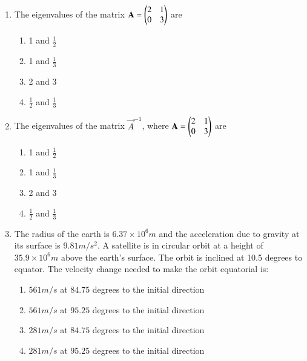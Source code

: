 \documentclass[journal]{IEEEtran}
\begin{document}
\begin{enumerate}
    \item The eigenvalues of the matrix $\mathbf{A} = \begin{pmatrix}2 & 1 \\ 0 & 3\end{pmatrix}$ are

    \begin{multicols}{4}
        \begin{enumerate}
            \item 1 and $\frac{1}{2}$
            \item 1 and $\frac{1}{3}$
            \item 2 and 3
            \item $\frac{1}{2}$ and $\frac{1}{3}$
        \end{enumerate}
    \end{multicols}

    \item The eigenvalues of the matrix $\vec{A}^{-1}$, where $\mathbf{A} = \begin{pmatrix}2 & 1 \\ 0 & 3\end{pmatrix}$ are

    \begin{multicols}{4}
        \begin{enumerate}
            \item 1 and $\frac{1}{2}$
            \item 1 and $\frac{1}{3}$
            \item 2 and 3
            \item $\frac{1}{2}$ and $\frac{1}{3}$
        \end{enumerate}
    \end{multicols}

    \item The radius of the earth is $6.37 \times 10^6 m$ and the acceleration due to gravity
    at its surface is $9.81 m/s^2$. A satellite is in circular orbit at a height of
    $35.9 \times 10^6 m$ above the earth's surface. The orbit is inclined at 10.5 degrees to
    equator. The velocity change needed to make the orbit equatorial is:

    \begin{enumerate}
        \item $561 m/s$ at $84.75$ degrees to the initial direction
        \item $561 m/s$ at $95.25$ degrees to the initial direction
        \item $281 m/s$ at $84.75$ degrees to the initial direction
        \item $281 m/s$ at $95.25$ degrees to the initial direction
    \end{enumerate}


\end{enumerate}
\end{document}
